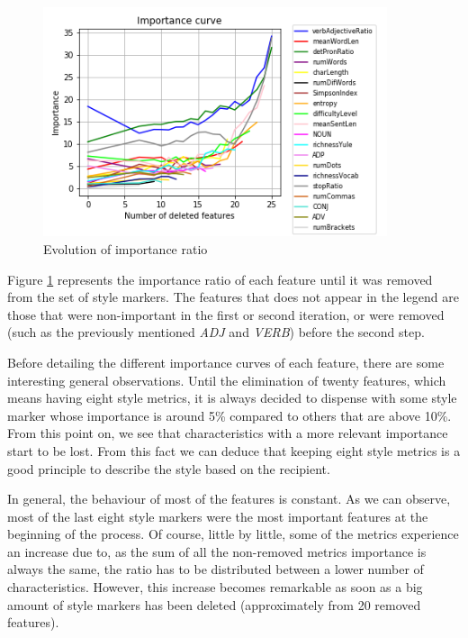 \begin{figure}
	\centering%
	\centerline{\includegraphics[width=0.9\textwidth]{Imagenes/Bitmap/DecisionTrees/limportancecurve.png}}%
	\caption{Evolution of importance ratio}%
	\label{fig:impcurv}
\end{figure}

Figure \ref{fig:impcurv} represents the importance ratio of each feature until it was removed from the set of style markers. The features that does not appear in the legend are those that were non-important in the first or second iteration, or were removed (such as the previously mentioned \textit{ADJ} and \textit{VERB}) before the second step.

Before detailing the different importance curves of each feature, there are some interesting general observations. Until the elimination of twenty features, which means having eight style metrics, it is always decided to dispense with some style marker whose importance is around 5\% compared to others that are above 10\%. From this point on, we see that characteristics with a more relevant importance start to be lost. From this fact we can deduce that keeping eight style metrics is a good principle to describe the style based on the recipient.

In general, the behaviour of most of the features is constant. As we can observe, most of the last eight style markers were the most important features at the beginning of the process. Of course, little by little, some of the metrics experience an increase due to, as the sum of all the non-removed metrics importance is always the same, the ratio has to be distributed between a lower number of characteristics. However, this increase becomes remarkable as soon as a big amount of style markers has been deleted (approximately from 20 removed features).

